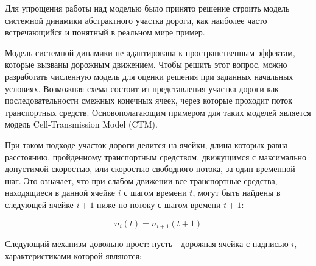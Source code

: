 Для упрощения работы над моделью было принято решение строить модель системной динамики абстрактного участка дороги, как наиболее часто встречающийся и понятный в реальном мире пример. 


Модель системной динамики не адаптирована к пространственным эффектам, которые вызваны дорожным движением. Чтобы решить этот вопрос, можно разработать численную модель для оценки решения при заданных начальных условиях. Возможная схема состоит из представления участка дороги как последовательности смежных конечных ячеек, через которые проходит поток транспортных средств. Основополагающим примером для таких моделей является модель Cell-Transmission Model (CTM).


При таком подходе участок дороги делится на ячейки, длина которых равна расстоянию, пройденному транспортным средством, движущимся с максимально допустимой скоростью, или скоростью свободного потока, за один временной шаг. Это означает, что при слабом движении все транспортные средства, находящиеся в данной ячейке $i$ с шагом времени $t$, могут быть найдены в следующей ячейке $i+1$ ниже по потоку с шагом времени $t+1$:

\begin{equation}
    n_i(t) = n_{i+1}(t+1)
\end{equation}



Следующий механизм довольно прост: пусть - дорожная ячейка с надписью $i$, характеристиками которой являются:


